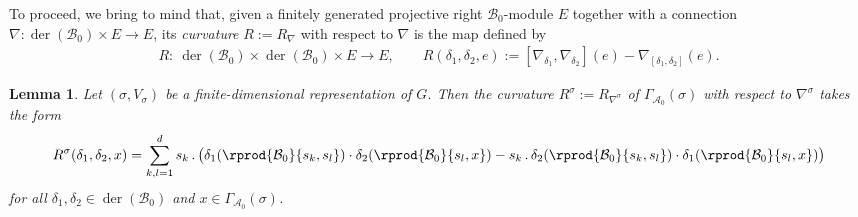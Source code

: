 \documentclass[10pt,a4paper]{amsart}
\numberwithin{equation}{section}
\newtheorem{Lemma}[Theorem]{Lemma}
\DeclareMathOperator{\der}{der}
\newcommand*{\acts}{\,.\,}
\newcommand*{\alg}{\mathcal}		%
\newcommand*{\aA}{\alg{A}}			%
\newcommand*{\aB}{\alg{B}} 			%
\begin{document}
To proceed, we bring to mind that, given a finitely generated projective right $\aB_0$-module $E$ together with a connection $\nabla\colon \der(\aB_0) \times E \to E$, its \emph{curvature} $R := R_\nabla$ with respect to $\nabla$ is the map defined by
	\begin{gather*}
		R \colon \ \der(\aB_0) \times \der(\aB_0) \times E \to E, \qquad R(\delta_1,\delta_2,e) := [ \nabla_{\delta_1},\nabla_{\delta_2} ] (e) - \nabla_{ [\delta_1,\delta_2] } (e).
	\end{gather*}

\begin{Lemma}\label{lem:cur}
	Let $(\sigma,V_\sigma)$ be a finite-dimensional representation of $G$.
	Then the curvature $R^\sigma := R_{\nabla^\sigma}$ of $\Gamma_{\aA_0}(\sigma)$ with respect to $\nabla^\sigma$ takes the form
	\begin{gather*}
	 	R^\sigma(\delta_1,\delta_2,x) = \sum_{k,l=1}^d s_k \acts \bigl( \delta_1 ( \rprod{\aB_0}{s_k,s_l} ) \cdot \delta_2 ( \rprod{\aB_0}{s_l,x} ) - s_k \acts \delta_2 ( \rprod{\aB_0}{s_k,s_l} ) \cdot \delta_1 ( \rprod{\aB_0}{s_l,x} ) \bigr)
	\end{gather*}
	for all $\delta_1,\delta_2 \in \der(\aB_0)$ and $x \in \Gamma_{\aA_0}(\sigma)$.
\end{Lemma}
\end{document}

